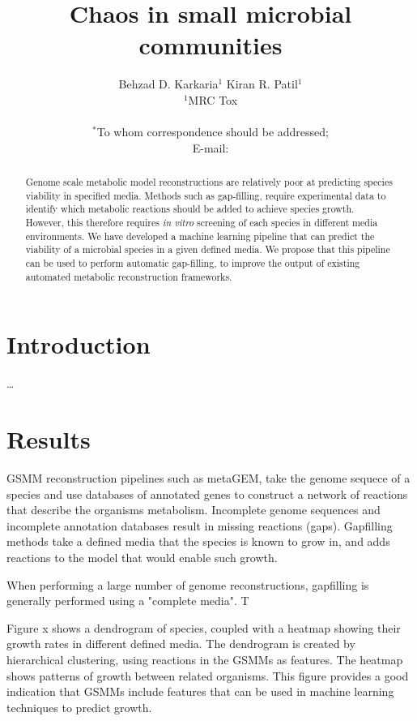 \documentclass[11pt,a4paper]{article}
\begin{document}
\title{Chaos in small microbial communities}
\author{Behzad D. Karkaria$^{1}$ Kiran R. Patil$^{1}$\\
\normalsize{$^{1}$MRC Tox}\\
\\
\normalsize{$^\ast$To whom correspondence should be addressed;}\\
\normalsize{E-mail: }
}
\date{}

\maketitle
\begin{abstract}
    Genome scale metabolic model reconstructions are relatively poor at predicting species viability in specified media. Methods such as gap-filling, require experimental data to identify which metabolic reactions should be added to achieve species growth. However, this therefore requires \textit{in vitro} screening of each species in different media environments. We have developed a machine learning pipeline that can predict the viability of a microbial species in a given defined media. We propose that this pipeline can be used to perform automatic gap-filling, to improve the output of existing automated metabolic reconstruction frameworks.
\end{abstract}

\section{Introduction}
\dots
\section{Results}
GSMM reconstruction pipelines such as metaGEM, take the genome sequece of a species and use databases of annotated genes to construct a network of reactions that describe the organisms metabolism. Incomplete genome sequences and incomplete annotation databases result in missing reactions (gaps). Gapfilling methods take a defined media that the species is known to grow in, and adds reactions to the model that would enable such growth. 
\par
When performing a large number of genome reconstructions, gapfilling is generally performed using a "complete media". T
\par
Figure x shows a dendrogram of species, coupled with a heatmap showing their growth rates in different defined media. The dendrogram is created by hierarchical clustering, using reactions in the GSMMs as features. The heatmap shows patterns of growth between related organisms. This figure provides a good indication that GSMMs include features that can be used in machine learning techniques to predict growth.
\end{document}
